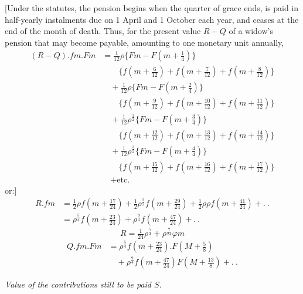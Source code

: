 [Under the statutes, the pension begins when the quarter of grace ends, is paid in half-yearly instalments due on 1 April and 1 October each year, and ceases at the end of the month of death. Thus, for the present value \(R-Q\) of a widow's pension that may become payable, amounting to one monetary unit annually,
\[
\begin{aligned}
(R-Q)\mathord{.}fm\mathord{.}Fm&=\tfrac{1}{12}\rho\{Fm-F(m+\tfrac{1}{4})\}\\
&\qquad\{f(m+\tfrac{6}{12})+f(m+\tfrac{7}{12})+f(m+\tfrac{8}{12})\}\\
&\quad+\tfrac{1}{12}\rho\{Fm-F(m+\tfrac{2}{4})\}\\
&\qquad\{f(m+\tfrac{9}{12})+f(m+\tfrac{10}{12})+f(m+\tfrac{11}{12})\}\\
&\quad+\tfrac{1}{12}\rho^{\frac{3}{2}}\{Fm-F(m+\tfrac{3}{4})\}\\
&\qquad\{f(m+\tfrac{12}{12})+f(m+\tfrac{13}{12})+f(m+\tfrac{14}{12})\}\\
&\quad+\tfrac{1}{12}\rho^{\frac{3}{2}}\{Fm-F(m+\tfrac{4}{4})\}\\
&\qquad\{f(m+\tfrac{15}{12})+f(m+\tfrac{16}{12})+f(m+\tfrac{17}{12})\}\\
&\quad+\text{etc.}
\end{aligned}
\]
\noindent or:]
\[
\begin{aligned}
R\mathord{.}fm&=\tfrac{1}{2}\rho f(m+\tfrac{17}{24})+\tfrac{1}{2}\rho^{\frac{3}{2}}f(m+\tfrac{29}{24})+\tfrac{1}{2}\rho\rho f(m+\tfrac{41}{24})+.\ .\\
&=\rho^{\frac{5}{4}}f(m+\tfrac{23}{24})+\rho^{\frac{9}{4}}f(m+\tfrac{47}{24})+.\ .
\end{aligned}
\]
\[
R=\tfrac{1}{24}\rho^{\frac{5}{4}}+\rho^{\frac{7}{24}}\varphi m
\]
\[
\begin{aligned}
Q\mathord{.}fm\mathord{.}Fm&=\rho^{\frac{5}{4}}f(m+\tfrac{23}{24})\mathord{.}F(M+\tfrac{5}{8})\\
&\quad+\rho^{\frac{9}{4}}f(m+\tfrac{47}{24})F(M+\tfrac{13}{8})+.\ .
\end{aligned}
\]
\begin{center}\textit{Value of the contributions still to be paid \(S\).}\end{center}
